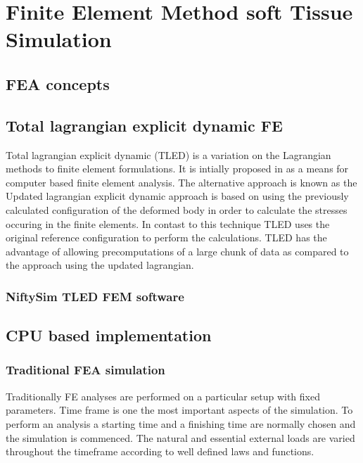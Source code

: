 \section{Finite Element Method soft Tissue Simulation}\label{methodology-fea}

\subsection{FEA concepts}

\subsection{Total lagrangian explicit dynamic FE}

  Total lagrangian explicit dynamic (TLED) is a variation on the Lagrangian methods to finite element formulations. It is intially proposed in \cite{Miller2007} as a means for computer based finite element analysis. The alternative approach is known as the Updated lagrangian explicit dynamic approach is based on using the previously calculated configuration of the deformed body in order to calculate the stresses occuring in the finite elements. In contast to this technique TLED uses the original reference configuration to perform the calculations. TLED has the advantage of allowing precomputations of a large chunk of data as compared to the approach using the updated lagrangian.

  \subsubsection{NiftySim TLED FEM software}

  \citet{Johnsen2014}

\subsection{CPU based implementation}

  \subsubsection{Traditional FEA simulation}

  Traditionally FE analyses are performed on a particular setup with fixed parameters. Time frame is one the most important aspects of the simulation. To perform an analysis a starting time and a finishing time are normally chosen and the simulation is commenced. The natural and essential external loads are varied throughout the timeframe according to well defined laws and functions.

